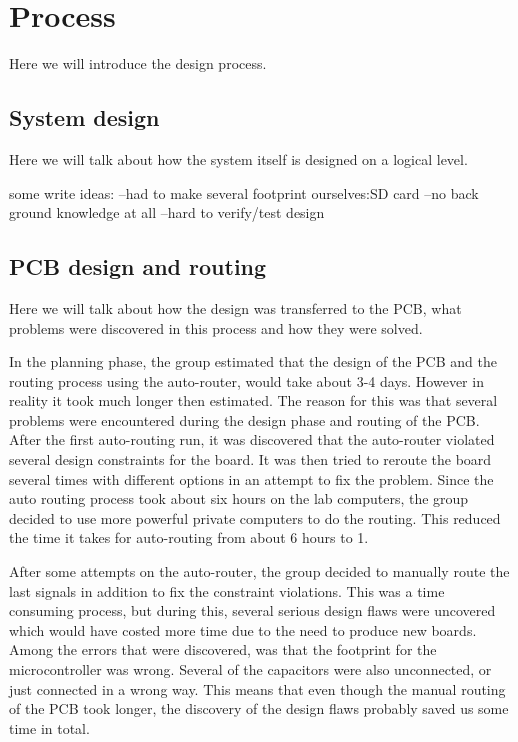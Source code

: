 \section {Process}

Here we will introduce the design process.

\subsection{System design} \label{pcb:process:ss:system_design}

Here we will talk about how the system itself is designed on a logical level.

some write ideas:
--had to make several footprint ourselves:SD card
--no back ground knowledge at all
--hard to verify/test design

\subsection{PCB design and routing} \label{pcb:process:ss:pcb_design_and_soldering}

Here we will talk about how the design was transferred to the PCB, what problems were discovered in this process and how they were solved.

In the planning phase, the group estimated that the design of the PCB and the routing process using the auto-router, would take about 3-4 days. However in reality it took much longer then estimated. The reason for this was that several
problems were encountered during the design phase and routing of the PCB. After the first auto-routing run, it was discovered that the auto-router violated several design constraints for the board. It was then tried to reroute the board several times
with different options in an attempt to fix the problem. Since the auto routing process took about six hours on the lab computers, the group decided to use more powerful private computers to do the routing. This reduced the time it takes for auto-routing from about 6 hours to 1.

After some attempts on the auto-router, the group decided to manually route the last signals in addition to fix the constraint violations. This was a time consuming process, but during this, several serious design flaws were uncovered which would have costed
more time due to the need to produce new boards. Among the errors that were discovered, was that the footprint for the microcontroller was wrong. Several of the capacitors were also unconnected, or just connected in a wrong way. This means that even though the manual routing of the PCB took longer,
the discovery of the design flaws probably saved us some time in total.
